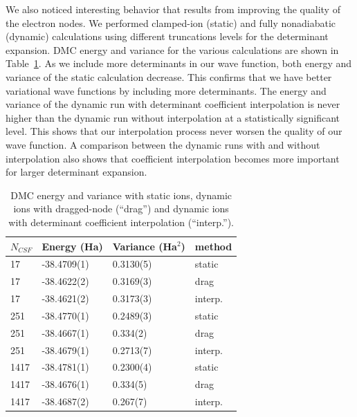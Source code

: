 \documentclass[aip,jcp,numerical,reprint]{revtex4-1}
\begin{document}
We also noticed interesting behavior that results from improving the quality of the electron nodes.  We performed clamped-ion (static) and fully nonadiabatic (dynamic) calculations using different truncations levels for the determinant expansion. DMC energy and variance for the various calculations are shown in Table~\ref{tab:energy}. As we include more determinants in our wave function, both energy and variance of the static calculation decrease. This confirms that we have better variational wave functions by including more determinants. The energy and variance of the dynamic run with determinant coefficient interpolation is never higher than the dynamic run without interpolation at a statistically significant level. This shows that our interpolation process never worsen the quality of our wave function. A comparison between the dynamic runs with and without interpolation also shows that coefficient interpolation becomes more important for larger determinant expansion.

\begin{table}[h]
\begin{tabular}{llll}
\hline\hline
$N_{CSF}$ & Energy (Ha) & Variance (Ha$^2$) & method \\
\hline
17   & -38.4709(1) &  0.3130(5) &    static \\
17   & -38.4622(2) &  0.3169(3) &   drag \\
17   & -38.4621(2) &  0.3173(3) &  interp. \\
251  & -38.4770(1)&  0.2489(3) &    static \\
251  & -38.4667(1) &  0.334(2)~  &   drag \\
251  & -38.4679(1) &  0.2713(7) &  interp. \\
1417 & -38.4781(1) &  0.2300(4) &    static \\
1417 & -38.4676(1) &  0.334(5)~  &   drag \\
1417 & -38.4687(2) &  0.267(7)~  &  interp. \\
\hline\hline
\end{tabular}
\caption{DMC energy and variance with static ions, dynamic ions with dragged-node (``drag'') and dynamic ions with determinant coefficient interpolation (``interp.'').\label{tab:energy}}
\end{table}
\end{document}
